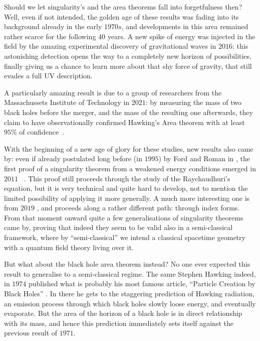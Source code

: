 Should we let singularity's and the area theorems fall into forgetfulness then? Well, even if not intended, the golden age of these results was fading into its background already in the early \(1970s\), and developments in this area remained rather scarce for the following \(40\) years. A new spike of energy was injected in the field by the amazing experimental discovery of gravitational waves in \(2016\): this astonishing detection opens the way to a completely new horizon of possibilities, finally giving us a chance to learn more about that shy force of gravity, that still evades a full UV description.

A particularly amazing result is due to a group of researchers from the Massachussets Institute of Technology in \(2021\): by measuring the mass of two black holes before the merger, and the mass of the resulting one afterwards, they claim to have observationally confirmed Hawking's Area theorem with at least \(95\%\) of confidence~\cite[]{PhysRevLett.127.011103}.

With the beginning of a new age of glory for these studies, new results also came by: even if already postulated long before (in \(1995\)) by Ford and Roman in \cite[]{ford1996averaged}, the first proof of a singularity theorem from a weakened energy conditions emerged in \(2011\)~\cite[]{fewster2011singularity} . This proof still proceeds through the study of the Raychaudhuri's equation, but it is very technical and quite hard to develop, not to mention the limited possibility of applying it more generally. A much more interesting one is from \(2019\) \cite[]{fewster2020new}, and proceeds along a rather different path: through index forms.
From that moment onward quite a few generalisations of singularity theorems came by, proving that indeed they seem to be valid also in a semi-classical framework, where by ``semi-classical'' we intend a classical spacetime geometry with a quantum field theory living over it.

But what about the black hole area theorem instead? No one ever expected this result to generalise to a semi-classical regime. The same Stephen Hawking indeed, in \(1974\) published what is probably his most famous article, ``Particle Creation by Black Holes'' \cite[]{hawking1975particle}. In there he gets to the staggering prediction of Hawking radiation, an emission process through which black holes slowly loose energy, and eventually evaporate. But the area of the horizon of a black hole is in direct relationship with its mass, and hence this prediction immediately sets itself against the previous result of \(1971\).

